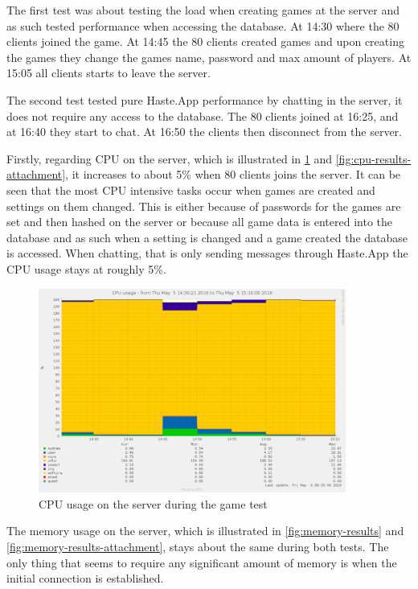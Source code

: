 \documentclass[a4paper]{article}
\begin{document}
The first test was about testing the load when creating games at the server and as such tested performance when accessing the database. At 14:30 where the 80 clients joined the game. At 14:45 the 80 clients created games and upon creating the games they change the games name, password and max amount of players. At 15:05 all clients starts to leave the server.

The second test tested pure Haste.App performance by chatting in the server, it does not require any access to the database. The 80 clients joined at 16:25, and at 16:40 they start to chat. At 16:50 the clients then disconnect from the server.

Firstly, regarding CPU on the server, which is illustrated in \cref{fig:cpu-results} and \cref{fig:cpu-results-attachment}, it increases to about 5\% when 80 clients joins the server. It can be seen that the most CPU intensive tasks occur when games are created and settings on them changed. This is either because of passwords for the games are set and then hashed on the server or because all game data is entered into the database and as such when a setting is changed and a game created the database is accessed. When chatting, that is only sending messages through Haste.App the CPU usage stays at roughly 5\%.
\begin{figure}[H]
    \includegraphics[width=0.9\textwidth]{figure/serversidePerformance/2016-05-05-game-test-cpu2.png}
    \caption{CPU usage on the server during the game test}
    \label{fig:cpu-results}
\end{figure}

The memory usage on the server, which is illustrated in \cref{fig:memory-results} and \cref{fig:memory-results-attachment}, stays about the same during both tests. The only thing that seems to require any significant amount of memory is when the initial connection is established. 
\end{document}
